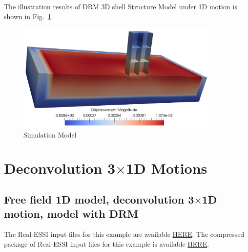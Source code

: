 The illustration results of DRM 3D shell Structure Model under 1D motion is shown 
in Fig.~\ref{fig_decon_1D_motion_3D_model_solid_shell_structure}. 

\begin{figure}[H]
  \centering
  \includegraphics[width = 10cm]{./Figure-files/Day2/Deconvolution_1D_Motions/Shell_Structure_Soil_Interaction_3D_DRM/shell_DRM3D.png}
  \caption{Simulation Model}
  \label{fig_decon_1D_motion_3D_model_solid_shell_structure}
\end{figure}



























\clearpage
\newpage
\section{Deconvolution 3$\times$1D Motions}
\label{Deconvolution_3by1D_Motions}
\subsection{Free field 1D model, deconvolution  3$\times$1D motion, model with DRM}
\label{Free_fields_1D_model_with_DRM2}

The Real-ESSI input files for this example are available 
\href{http://sokocalo.engr.ucdavis.edu/~jeremic/lecture_notes_online_material/_Chapter_Short_Course_Examples/Day2/Deconvolution_3by1D_Motions/Free_fields_1D_model_with_DRM}{HERE}. 
The compressed package of Real-ESSI input files for this example is available 
\href{http://sokocalo.engr.ucdavis.edu/~jeremic/lecture_notes_online_material/_Chapter_Short_Course_Examples/Day2/Deconvolution_3by1D_Motions/Free_fields_1D_model_with_DRM/_all_files_packaged_for_Free_fields_1D_model_with_DRM.tar.gz}{HERE}. 

